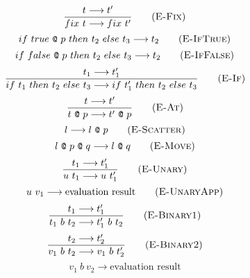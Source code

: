 \documentclass{report}
\makeatletter
\newcommand{\at}{~\texttt{@}~}
\makeatother
\begin{document}
\begin{figure}
\begin{multicols}{2}
\begin{equation}
      \frac{t\longrightarrow t'}{fix~t\longrightarrow fix~t'}
      \tag{\textsc{E-Fix}}
      \label{efix}
    \end{equation}
    \begin{equation}
      if~true\at p~then~t_2~else~t_3\longrightarrow t_2
      \tag{\textsc{E-IfTrue}}
      \label{eiftrue}
    \end{equation}
    \begin{equation}
      if~false\at p~then~t_2~else~t_3\longrightarrow t_2
      \tag{\textsc{E-IfFalse}}
      \label{eiffalse}
    \end{equation}
    \begin{equation}
      \frac{t_1\longrightarrow t_1'}{if~t_1~then~t_2~else~t_3\longrightarrow if~t_1'~then~t_2~else~t_3}
      \tag{\textsc{E-If}}
      \label{eif}
    \end{equation}
    \begin{equation}
      \frac{t \longrightarrow t'}{t\at p\longrightarrow t'\at p}
    \tag{\textsc{E-At}}
    \label{eat}
    \end{equation}
    \begin{equation}
      l \longrightarrow l\at p
    \tag{\textsc{E-Scatter}}
    \label{escatter}
    \end{equation}
    \begin{equation}
      l\at p\at q \longrightarrow l\at q
    \tag{\textsc{E-Move}}
    \label{emove}
    \end{equation}
    \begin{equation}
      \frac{t_1\longrightarrow t_1'}{u~t_1\longrightarrow u~t_1'}
      \tag{\textsc{E-Unary}}
      \label{eunary}
    \end{equation}
    \begin{equation}
      u~v_1 \longrightarrow \textrm{evaluation result}
    \tag{\textsc{E-UnaryApp}}
    \label{eunaryapp}
    \end{equation}
    \begin{equation}
      \frac{t_1\longrightarrow t_1'}{t_1~b~t_2\longrightarrow t_1'~b~t_2}
      \tag{\textsc{E-Binary1}}
      \label{ebinary1}
    \end{equation}
    \begin{equation}
      \frac{t_2\longrightarrow t_2'}{v_1~b~t_2\longrightarrow v_1~b~t_2'}
      \tag{\textsc{E-Binary2}}
      \label{ebinary2}
    \end{equation}
    \begin{equation}
      v_1~b~v_2 \longrightarrow \textrm{evaluation result}

\end{equation}
\end{multicols}
\end{figure}
\end{document}

